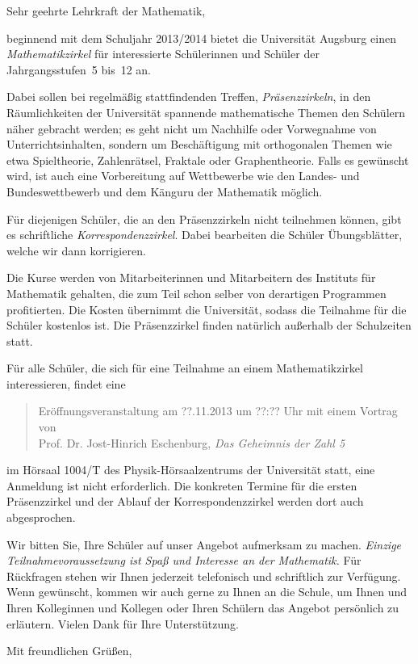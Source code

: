 \documentclass{zirkelbrief}
\begin{document}
\renewcommand{\anschrift}{%
      Holbein-Gymnasium Augsburg \\
      Fachbereich Mathematik \\
      Hallstraße 10 \\
      86150 Augsburg}
\renewcommand{\datum}{2.9.2013}
\renewcommand{\betreff}{Matheschülerzirkel der Universität Augsburg}

\makeletterhead

Sehr geehrte Lehrkraft der Mathematik,

beginnend mit dem Schuljahr 2013/2014 bietet die Universität Augsburg
einen \emph{Mathematikzirkel} für interessierte Schülerinnen und Schüler der
Jahrgangsstufen~5 bis~12 an.

Dabei sollen bei regelmäßig stattfindenden Treffen, \emph{Präsenzzirkeln}, in
den Räumlichkeiten der Universität spannende mathematische Themen den Schülern
näher gebracht werden; es geht nicht um Nachhilfe oder Vorwegnahme von
Unterrichtsinhalten, sondern um Beschäftigung mit orthogonalen Themen wie etwa
Spieltheorie, Zahlenrätsel, Fraktale oder Graphentheorie. Falls es gewünscht
wird, ist auch eine Vorbereitung auf Wettbewerbe wie den Landes- und
Bundeswettbewerb und dem Känguru der Mathematik möglich.

Für diejenigen Schüler, die an den Präsenzzirkeln nicht teilnehmen können, gibt
es schriftliche \emph{Korrespondenzzirkel}. Dabei bearbeiten die Schüler
Übungsblätter, welche wir dann korrigieren.

Die Kurse werden von Mitarbeiterinnen und Mitarbeitern des
Instituts für Mathematik gehalten, die zum Teil schon selber von derartigen
Programmen profitierten. Die Kosten übernimmt die Universität, sodass die Teilnahme für die Schüler
kostenlos ist. Die Präsenzzirkel finden natürlich außerhalb der Schulzeiten
statt.

Für alle Schüler, die sich für eine Teilnahme an einem Mathematikzirkel
interessieren, findet eine
\begin{quote}
    Eröffnungsveranstaltung am ??.11.2013 um ??:?? Uhr mit einem Vortrag von \\
    Prof. Dr. Jost-Hinrich Eschenburg, \emph{Das
    Geheimnis der Zahl 5}
\end{quote}
im Hörsaal 1004/T des Physik-Hörsaalzentrums der Universität statt, eine
Anmeldung ist nicht erforderlich. Die konkreten Termine für die
ersten Präsenzzirkel und der Ablauf der Korrespondenzzirkel werden dort auch
abgesprochen.

Wir bitten Sie, Ihre Schüler auf unser
Angebot aufmerksam zu machen. \emph{Einzige Teilnahmevoraussetzung ist Spaß und
Interesse an der Mathematik.} Für Rückfragen stehen wir Ihnen jederzeit
telefonisch und schriftlich zur
Verfügung. Wenn gewünscht, kommen wir auch gerne zu Ihnen an die
Schule, um Ihnen und Ihren Kolleginnen und Kollegen oder Ihren Schülern das
Angebot persönlich zu erläutern. Vielen Dank für Ihre Unterstützung.

Mit freundlichen Grüßen,
\end{document}

